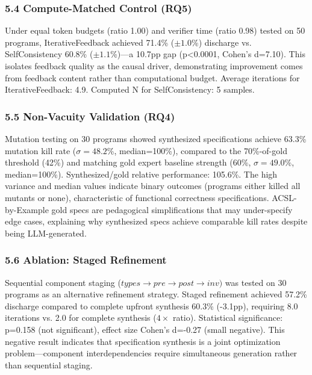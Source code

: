 \subsubsection{5.4 Compute-Matched Control (RQ5)}

Under equal token budgets (ratio 1.00) and verifier time (ratio 0.98) tested on 50 programs, IterativeFeedback achieved 71.4\% ($\pm 1.0$\%) discharge vs. SelfConsistency 60.8\% ($\pm 1.1$\%)---a 10.7pp gap (p<0.0001, Cohen's d=7.10). This isolates feedback quality as the causal driver, demonstrating improvement comes from feedback content rather than computational budget. Average iterations for IterativeFeedback: 4.9. Computed N for SelfConsistency: 5 samples.

\subsubsection{5.5 Non-Vacuity Validation (RQ4)}

Mutation testing on 30 programs showed synthesized specifications achieve 63.3\% mutation kill rate ($\sigma =48.2$\%, median=100\%), compared to the 70\%-of-gold threshold (42\%) and matching gold expert baseline strength (60\%, $\sigma =49.0$\%, median=100\%). Synthesized/gold relative performance: 105.6\%. The high variance and median values indicate binary outcomes (programs either killed all mutants or none), characteristic of functional correctness specifications. ACSL-by-Example gold specs are pedagogical simplifications that may under-specify edge cases, explaining why synthesized specs achieve comparable kill rates despite being LLM-generated.

\subsubsection{5.6 Ablation: Staged Refinement}

Sequential component staging ($types\rightarrow pre\rightarrow post\rightarrow inv)$ was tested on 30 programs as an alternative refinement strategy. Staged refinement achieved 57.2\% discharge compared to complete upfront synthesis 60.3\% (-3.1pp), requiring 8.0 iterations vs. 2.0 for complete synthesis ($4\times$ ratio). Statistical significance: p=0.158 (not significant), effect size Cohen's d=-0.27 (small negative). This negative result indicates that specification synthesis is a joint optimization problem---component interdependencies require simultaneous generation rather than sequential staging.
